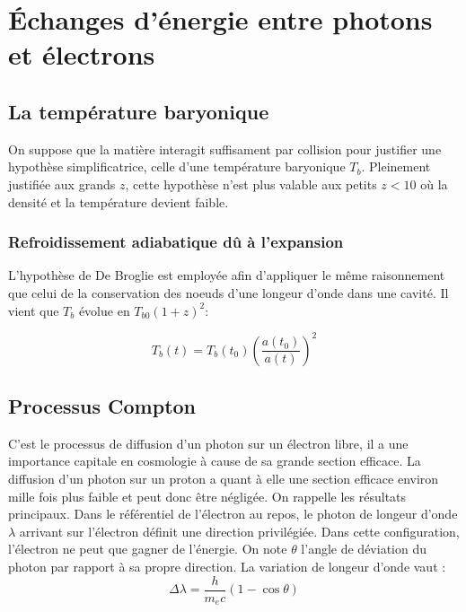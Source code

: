 \documentclass[10pt, a4paper]{report}
\numberwithin{equation}{subsection}
\begin{document}
\section{\uppercase{é}changes d'énergie entre photons et électrons}
\subsection{La température baryonique}
On suppose que la matière interagit suffisament par collision pour justifier une hypothèse simplificatrice, celle d'une température baryonique $T_b$. Pleinement justifiée aux grands $z$, cette hypothèse n'est plus valable aux petits $z < 10$ où la densité et la température devient faible.
\subsubsection{Refroidissement adiabatique dû à l'expansion}
L'hypothèse de De Broglie est employée afin d'appliquer le même raisonnement que celui de la conservation des noeuds d'une longeur d'onde dans une cavité. Il vient que $T_b$ évolue en $T_{b0} (1+z)^2$:

\begin{equation} \label{eq:RTB}
\boxed{T_b(t) = T_b(t_0) \left(\frac{a(t_0)}{a(t)}\right)^2}
\end{equation}

\subsection{Processus Compton}
C'est le processus de diffusion d'un photon sur un électron libre, il a une importance capitale en cosmologie à cause de sa grande section efficace. La diffusion d’un photon sur un proton a quant à elle une section efficace environ mille fois plus faible et peut donc être négligée. On rappelle les résultats principaux. Dans le référentiel de l'électron au repos, le photon de longeur d'onde $\lambda$ arrivant sur l'électron définit une direction privilégiée. Dans cette configuration, l'électron ne peut que gagner de l'énergie. On note $\theta$ l'angle de déviation du photon par rapport à sa propre direction.
La variation de longeur d'onde vaut :
\begin{equation} \label{eq:VLO}
\boxed{\Delta\lambda=\frac{h}{m_e c}(1 - \cos \theta)}
\end{equation}
\end{document}
